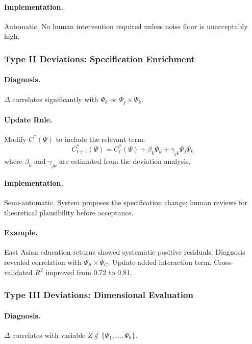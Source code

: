 \paragraph{Implementation.}
Automatic. No human intervention required unless noise floor is unacceptably high.

\subsubsection{Type II Deviations: Specification Enrichment}

\paragraph{Diagnosis.}
$\Delta$ correlates significantly with $\Psi_k$ or $\Psi_j \times \Psi_k$.

\paragraph{Update Rule.}
Modify $C^*(\Psi)$ to include the relevant term:
\begin{equation}
C^*_{t+1}(\Psi) = C^*_t(\Psi) + \beta_k \Psi_k + \gamma_{jk} \Psi_j \Psi_k
\end{equation}
where $\beta_k$ and $\gamma_{jk}$ are estimated from the deviation analysis.

\paragraph{Implementation.}
Semi-automatic. System proposes the specification change; human reviews for 
theoretical plausibility before acceptance.

\paragraph{Example.}
East Asian education returns showed systematic positive residuals. Diagnosis 
revealed correlation with $\Psi_S \times \Psi_C$. Update added interaction 
term. Cross-validated $R^2$ improved from 0.72 to 0.81.

\subsubsection{Type III Deviations: Dimensional Evaluation}

\paragraph{Diagnosis.}
$\Delta$ correlates with variable $Z \notin \{\Psi_1, \ldots, \Psi_8\}$.

